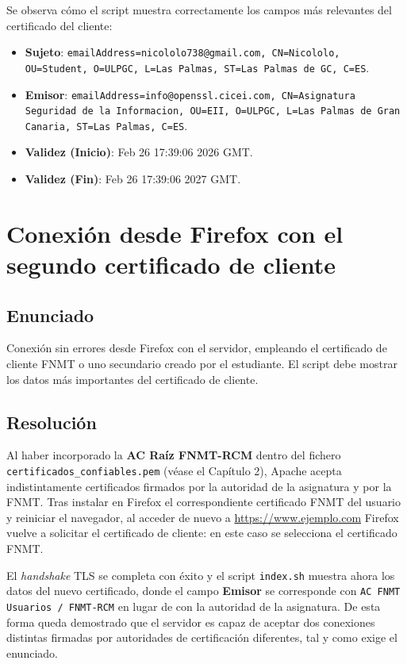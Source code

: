 \documentclass[12pt,a4paper]{report}
\begin{document}
Se observa cómo el script muestra correctamente los campos más relevantes del certificado del cliente:
\begin{itemize}
    \item \textbf{Sujeto}: \texttt{emailAddress=nicololo738@gmail.com, CN=Nicololo, OU=Student, O=ULPGC, L=Las Palmas, ST=Las Palmas de GC, C=ES}.
    \item \textbf{Emisor}: \texttt{emailAddress=info@openssl.cicei.com, CN=Asignatura Seguridad de la Informacion, OU=EII, O=ULPGC, L=Las Palmas de Gran Canaria, ST=Las Palmas, C=ES}.
    \item \textbf{Validez (Inicio)}: Feb 26 17:39:06 2026 GMT.
    \item \textbf{Validez (Fin)}: Feb 26 17:39:06 2027 GMT.
\end{itemize}


\chapter{Conexión desde Firefox con el segundo certificado de cliente}
\section{Enunciado}
Conexión sin errores desde Firefox con el servidor, empleando el certificado de cliente FNMT o uno secundario creado por el estudiante. El script debe mostrar los datos más importantes del certificado de cliente.

\section{Resolución}
Al haber incorporado la \textbf{AC Raíz FNMT-RCM} dentro del fichero \texttt{certificados\_confiables.pem} (véase el Capítulo 2), Apache acepta indistintamente certificados firmados por la autoridad de la asignatura y por la FNMT. Tras instalar en Firefox el correspondiente certificado FNMT del usuario y reiniciar el navegador, al acceder de nuevo a \url{https://www.ejemplo.com} Firefox vuelve a solicitar el certificado de cliente: en este caso se selecciona el certificado FNMT.

El \textit{handshake} TLS se completa con éxito y el script \texttt{index.sh} muestra ahora los datos del nuevo certificado, donde el campo \textbf{Emisor} se corresponde con \texttt{AC FNMT Usuarios / FNMT-RCM} en lugar de con la autoridad de la asignatura. De esta forma queda demostrado que el servidor es capaz de aceptar dos conexiones distintas firmadas por autoridades de certificación diferentes, tal y como exige el enunciado.
\end{document}
